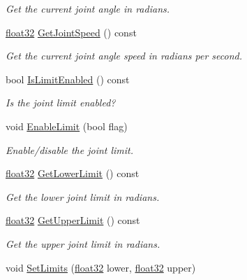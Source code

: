 \begin{DoxyCompactItemize}
\begin{DoxyCompactList}\small\item\em Get the current joint angle in radians. \end{DoxyCompactList}\item 
\mbox{\hyperlink{b2_settings_8h_aacdc525d6f7bddb3ae95d5c311bd06a1}{float32}} \mbox{\hyperlink{classb2_revolute_joint_a631b7bd2c72b61f03b6efc605308092f}{Get\+Joint\+Speed}} () const
\begin{DoxyCompactList}\small\item\em Get the current joint angle speed in radians per second. \end{DoxyCompactList}\item 
bool \mbox{\hyperlink{classb2_revolute_joint_a84ff9c4f82b3e7d27a4390164f81f3ab}{Is\+Limit\+Enabled}} () const
\begin{DoxyCompactList}\small\item\em Is the joint limit enabled? \end{DoxyCompactList}\item 
void \mbox{\hyperlink{classb2_revolute_joint_a56bdfdd04e906e52d0258f6a481b9093}{Enable\+Limit}} (bool flag)
\begin{DoxyCompactList}\small\item\em Enable/disable the joint limit. \end{DoxyCompactList}\item 
\mbox{\hyperlink{b2_settings_8h_aacdc525d6f7bddb3ae95d5c311bd06a1}{float32}} \mbox{\hyperlink{classb2_revolute_joint_a1e34ad0cc3289d90bff8140c5d6261d2}{Get\+Lower\+Limit}} () const
\begin{DoxyCompactList}\small\item\em Get the lower joint limit in radians. \end{DoxyCompactList}\item 
\mbox{\hyperlink{b2_settings_8h_aacdc525d6f7bddb3ae95d5c311bd06a1}{float32}} \mbox{\hyperlink{classb2_revolute_joint_a5c30cf83116841607d4d819985732efb}{Get\+Upper\+Limit}} () const
\begin{DoxyCompactList}\small\item\em Get the upper joint limit in radians. \end{DoxyCompactList}\item 
void \mbox{\hyperlink{classb2_revolute_joint_a32f9393d8a6b993fd523f0f643c28107}{Set\+Limits}} (\mbox{\hyperlink{b2_settings_8h_aacdc525d6f7bddb3ae95d5c311bd06a1}{float32}} lower, \mbox{\hyperlink{b2_settings_8h_aacdc525d6f7bddb3ae95d5c311bd06a1}{float32}} upper)

\end{DoxyCompactItemize}
